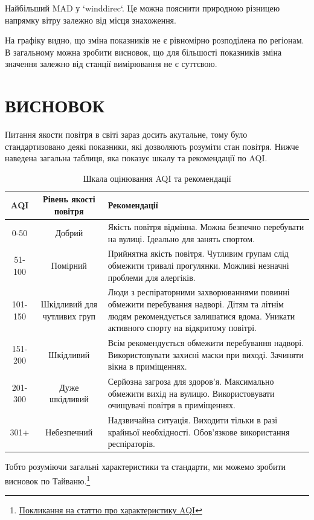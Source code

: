 \documentclass{article}
\begin{document}
\begin{enumerate}
\begin{center}
    \end{center}
    Найбільший MAD у `winddirec`. Це можна пояснити природною різницею напрямку вітру залежно від місця знахоження.

    На графіку видно, що зміна показників не є рівномірно розподілена по регіонам. В загальному можна зробити висновок, що для більшості 
показників зміна значення залежно від станції вимірювання не є суттєвою.
\end{enumerate}

\pagebreak

\newpage
\section{ВИСНОВОК}
Питання якости повітря в світі зараз досить акутальне, тому було стандартизовано деякі показники, які дозволяють розуміти стан повітря.
Нижче наведена загальна таблиця, яка показує шкалу та рекомендації по AQI.
\begin{table}
    \centering
    \renewcommand{\arraystretch}{1.3}
    \setlength{\arrayrulewidth}{1pt}
    \begin{tabular}{|c|c|p{8cm}|}
        \hline
        \rowcolor{gray!20} \textbf{AQI} & \textbf{Рівень якості повітря} & \textbf{Рекомендації} \\
        \hline
        \rowcolor{green!40} 0-50 & Добрий & Якість повітря відмінна. Можна безпечно перебувати на вулиці. Ідеально для занять спортом. \\
        \hline
        \rowcolor{yellow!40} 51-100 & Помірний & Прийнятна якість повітря. Чутливим групам слід обмежити тривалі прогулянки. Можливі незначні проблеми для алергіків. \\
        \hline
        \rowcolor{orange!60} 101-150 & Шкідливий для чутливих груп & Люди з респіраторними захворюваннями повинні обмежити перебування надворі. Дітям та літнім людям рекомендується залишатися вдома. Уникати активного спорту на відкритому повітрі. \\
        \hline
        \rowcolor{red!60} 151-200 & Шкідливий & Всім рекомендується обмежити перебування надворі. Використовувати захисні маски при виході. Зачиняти вікна в приміщеннях. \\
        \hline
        \rowcolor{purple!50} 201-300 & Дуже шкідливий & Серйозна загроза для здоров’я. Максимально обмежити вихід на вулицю. Використовувати очищувачі повітря в приміщеннях. \\
        \hline
        \rowcolor{black!40} 301+ & Небезпечний & Надзвичайна ситуація. Виходити тільки в разі крайньої необхідності. Обов’язкове використання респіраторів. \\
        \hline
    \end{tabular}
    \caption{Шкала оцінювання AQI та рекомендації}
    \label{tab:AQI_scale}
\end{table}
Тобто розуміючи загальні характеристики та стандарти, ми можемо зробити висновок по Тайваню.\footnote{\href{https://center-ltd.com.ua/novyny/normy-indeksu-yakosti-povitrya-yak-rozumity-pokaznyky-ta-zahystyty-svoye-zdorov-ya/}{Покликання на статтю про характеристику AQI}}
\end{document}
